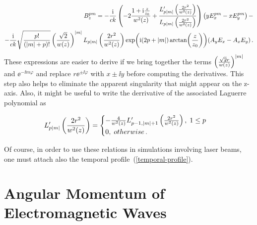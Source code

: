 \documentclass[12pt, class=report, crop=false]{standalone}
\begin{document}
\begin{equation}
  \begin{aligned}
  B_z^{pm} = - \frac{\mathrm{i}}{ck} \left(-2\frac{1+\mathrm{i}\frac{z}{z_0}}{w^2(z)} +\frac{L_{p\abs{m}}'\left(\frac{2r^2}{w^2(z)}\right)}{L_{p\abs{m}}\left(\frac{2r^2}{w^2(z)}\right)}\right) \left( yE_x^{pm} - xE_y^{pm} \right) - \\
  -\frac{\mathrm{i}}{ck}\sqrt{\frac{p!}{(\abs{m}+p)!}} \left(\frac{\sqrt{2}}{w(z)}\right)^{\abs{m}} L_{p\abs{m}} \left(\frac{2r^2}{w^2(z)}\right) \exp(\mathrm{i} (2p+\abs{m}) \arctan(\frac{z}{z_0})) (A_y E_x - A_x E_y)\,.
  \end{aligned}
\end{equation}
These expressions are easier to derive if we bring together the terms \(\left(\frac{\sqrt{2}r}{w(z)}\right)^{\abs{m}}\) and \(\ee^{-\ii m \varphi}\) and replace \(r\ee^{\pm\ii \varphi}\) with \(x\pm\ii y\) before computing the derivatives. This step also helps to eliminate the apparent singularity that might appear on the z-axis. Also, it might be useful to write the derrivative of the associated Laguerre polynomial as

\begin{equation}
  L_{p\abs{m}}'\left(\frac{2r^2}{w^2(z)}\right) =
  \begin{cases}
    - \frac{4}{w^2(z)} L_{p-1,\abs{m}+1}'\left(\frac{2r^2}{w^2(z)}\right),\; 1\leq p\\
    0,\; otherwise\,.
  \end{cases}
\end{equation}

Of course, in order to use these relations in simulations involving laser beams, one must attach also the temporal profile~(\ref{temporal-profile}).
\section{Angular Momentum of Electromagnetic Waves}
\end{document}
